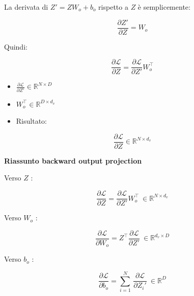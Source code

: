 \documentclass[
  11pt,
]{article}
\begin{document}
La derivata di \(Z' = ZW_{o} + b_{o}\) rispetto a \(Z\) è semplicemente:

\[\frac{\partial Z'}{\partial Z} = W_{o}\]

Quindi:

\[\frac{\partial\mathcal{L}}{\partial Z} = \frac{\partial\mathcal{L}}{\partial Z'}W_{o}^{\top}\]


\begin{itemize}
\item
  \(\frac{\partial\mathcal{L}}{\partial Z'} \in \mathbb{R}^{N \times D}\)
\item
  \(W_{o}^{\top} \in \mathbb{R}^{D \times d_v}\)
\item
  Risultato:
\end{itemize}


\[\frac{\partial\mathcal{L}}{\partial Z} \in \mathbb{R}^{N \times d_v}\]

\textbf{Riassunto backward output projection}


Verso \(Z\) :


\[\frac{\partial\mathcal{L}}{\partial Z} = \frac{\partial\mathcal{L}}{\partial Z'}W_{o}^{\top}\  \in \mathbb{R}^{N \times d_v}\]


Verso \(W_{o}\) :


\[\frac{\partial\mathcal{L}}{\partial W_{o}} = Z^{\top}\frac{\partial\mathcal{L}}{\partial Z'}\  \in \mathbb{R}^{d_v \times D}\]


Verso \(b_{o}\) :


\[\frac{\partial\mathcal{L}}{\partial b_{o}} = \sum_{i = 1}^{N}\,\frac{\partial\mathcal{L}}{\partial Z_{i}'}\  \in \mathbb{R}^{D}\]
\end{document}
